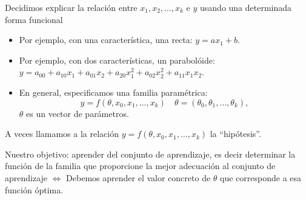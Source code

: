 \documentclass[aspectratio=169]{beamer}
\begin{document}
 \begin{frame}
   \begin{block}{Decidimos explicar la relación entre $x_1, x_2,
       \ldots, x_k$ e $y$ usando una determinada forma funcional}
     \begin{itemize}
     \item<+-> Por ejemplo, con una característica,  una recta: $y=ax_1+b$.
     \item<+-> Por ejemplo, con dos características, un parabolóide:
       $y=a_{00}+a_{10}x_1+a_{01}x_2+a_{20}x_1^2+a_{02}x_2^2+a_{11}x_1x_2$.
     \item<+-> En general, especificamos una familia paramétrica:
$$y=f(\theta,x_0, x_1, \ldots, x_k)\quad \theta=(\theta_0, \theta_1,\ldots,\theta_k),$$
$\theta$ es un vector de parámetros.
     \end{itemize}
 A veces llamamos a la relación $y=f(\theta,x_0,x_1,
\ldots, x_k)$ la ``hipótesis''.    
   \end{block}
   \begin{block}{Nuestro objetivo: aprender del conjunto de aprendizaje,}
 es decir determinar  la función de la familia que proporcione la \alert{mejor} adecuación al conjunto de aprendizaje  $\Leftrightarrow$ Debemos aprender el valor concreto de $\theta$ que corresponde a esa función óptima.
   \end{block}
 \end{frame}
\end{document}
